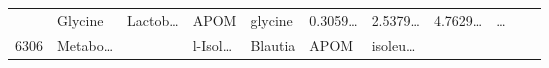 \documentclass[
]{article}
\begin{document}
\begin{longtable}[]{@{}lllllllllll@{}}
\begin{minipage}[t]{0.07\columnwidth}
\strut
\end{minipage} & \begin{minipage}[t]{0.09\columnwidth}\raggedright
Glycine\strut
\end{minipage} & \begin{minipage}[t]{0.07\columnwidth}\raggedright
Lactob\ldots{}\strut
\end{minipage} & \begin{minipage}[t]{0.07\columnwidth}\raggedright
APOM\strut
\end{minipage} & \begin{minipage}[t]{0.09\columnwidth}\raggedright
glycine\strut
\end{minipage} & \begin{minipage}[t]{0.07\columnwidth}\raggedright
0.3059\ldots{}\strut
\end{minipage} & \begin{minipage}[t]{0.07\columnwidth}\raggedright
2.5379\ldots{}\strut
\end{minipage} & \begin{minipage}[t]{0.07\columnwidth}\raggedright
4.7629\ldots{}\strut
\end{minipage} & \begin{minipage}[t]{0.03\columnwidth}\raggedright
\ldots{}\strut
\end{minipage}\tabularnewline
\begin{minipage}[t]{0.03\columnwidth}\raggedright
6306\strut
\end{minipage} & \begin{minipage}[t]{0.07\columnwidth}\raggedright
Metabo\ldots{}\strut
\end{minipage} & \begin{minipage}[t]{0.07\columnwidth}\raggedright
\strut
\end{minipage} & \begin{minipage}[t]{0.09\columnwidth}\raggedright
l-Isol\ldots{}\strut
\end{minipage} & \begin{minipage}[t]{0.07\columnwidth}\raggedright
Blautia\strut
\end{minipage} & \begin{minipage}[t]{0.07\columnwidth}\raggedright
APOM\strut
\end{minipage} & \begin{minipage}[t]{0.09\columnwidth}\raggedright
isoleu\ldots{}\strut
\end{minipage} & \begin{minipage}[t]{0.07\columnwidth}\raggedright

\end{minipage}
\end{longtable}
\end{document}
